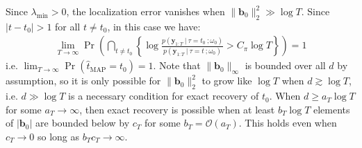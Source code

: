 Since $\lambda_{\min} > 0$, the localization error vanishes when $\lVert \mathbf{b}_0\rVert_2^2 \gg \log T$. Since $|t - t_0| > 1$ for all $t\neq t_0$, in this case we have:
\begin{align*}
    \lim_{T\to\infty}\Pr\left(\bigcap_{t \neq t_0}\left\{ \log \frac{p(\mathbf{y}_{1:T} \:|\:\tau = t_0 \:; \omega_0)}{p(\mathbf{y}_{1:T} \:|\:\tau = t \:; \omega_0)} > C_\pi \log T\right\}\right) = 1
\end{align*}
i.e. $\lim_{T\to\infty}\Pr(\hat{t}_{\text{MAP}} = t_0) = 1$. Note that $\lVert\mathbf{b}_0\rVert_\infty$ is bounded over all $d$ by assumption, so it is only possible for $\lVert \mathbf{b}_0\rVert_2^2$ to grow like $\log T$ when $d \gtrsim \log T$, i.e. $d \gg \log T$ is a necessary condition for exact recovery of $t_0$. When $d \geq a_T\log T$ for some $a_T\to\infty$, then exact recovery is possible when at least $b_T \log T$ elements of $|\mathbf{b}_0|$ are bounded below by $c_T$ for some $b_T = \mathcal{O}(a_T)$. This holds even when $c_T \to 0$ so long as $b_T c_T \to \infty$. 

